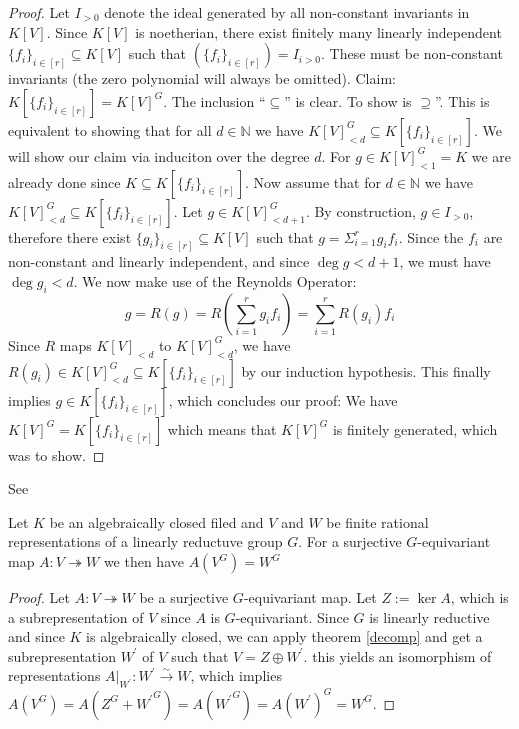 \begin{proof}
  Let $I_{>0}$ denote the ideal generated by all non-constant invariants in $K[V]$.
  Since $K[V]$ is noetherian, there exist finitely many linearly independent $\{f_i\}_{i \in [r]} \subseteq K[V]$ such that $ \left( \{f_i\}_{i \in [r]} \right) = I_{i>0} $.
  These must be non-constant invariants (the zero polynomial will always be omitted).
  Claim: $K[\{f_i\}_{i \in [r]}] = K[V]^G$.
  The inclusion ``$\subseteq$'' is clear.
  To show is $\supseteq$''.
  This is equivalent to showing that for all $d \in \mathbb{N}$ we have $K[V]^G_{<d} \subseteq K[\{f_i\}_{i \in [r]}] $.
  We will show our claim via induciton over the degree $d$.
  For $g \in K[V]^G_{<1} = K$ we are already done since $K \subseteq K[\{f_i\}_{i \in [r]}]$.
  Now assume that for $d \in \mathbb{N}$ we have $K[V]^G_{<d} \subseteq K[\{f_i\}_{i \in [r]}]$.
  Let $g \in K[V]^G_{< d+1}$.
  By construction, $g \in I_{>0}$, therefore there exist $\{g_i\}_{i \in [r]} \subseteq K[V]$ such that $g = \Sigma_{i=1}^r g_i f_i$.
  Since the $f_i$ are non-constant and linearly independent, and since $\operatorname{deg} g < d+1$, we must have $ \operatorname{deg} g_i < d $.
  We now make use of the Reynolds Operator:
  \begin{equation}
      g = R(g)
      =  R \left( \sum_{i=1}^r g_i f_i \right)
      = \sum_{i=1}^r R( g_i) f_i
  \end{equation}
  Since $R$ maps $K[V]_{<d}$ to $K[V]^G_{<d}$, we have $R(g_i) \in K[V]^G_{<d} \subseteq K[\{f_i\}_{i \in [r]}]$ by our induction hypothesis.
  This finally implies $ g \in K[\{f_i\}_{i \in [r]}]$, which concludes our proof:
  We have $K[V]^G = K[\{f_i\}_{i \in [r]}]$ which means that $K[V]^G$ is finitely generated, which was to show.
\end{proof}

\begin{lemma}
  See \cite[2.2.8]{DK15}

  Let $K$ be an algebraically closed filed and $V$ and $W$ be finite rational representations of a linearly reductuve group $G$.
  For a surjective $G$-equivariant map $A \colon V \twoheadrightarrow W$ we then have $A(V^G) = W^G$
\end{lemma}

\begin{proof}
  Let $A \colon V \twoheadrightarrow W$ be a surjective $G$-equivariant map.
  Let $Z := \operatorname{ker}A$, which is a subrepresentation of $V$ since $A$ is $G$-equivariant.
  Since $G$ is linearly reductive and since $K$ is algebraically closed, we can apply theorem \ref{decomp} and get a subrepresentation $W^\prime$ of $V$ such that $V = Z \oplus W^\prime$.
  this yields an isomorphism of representations $\left. A \right|_{W^\prime} \colon W^\prime \xrightarrow{\sim} W$, which implies $A(V^G) = A(Z^G + {W^\prime}^G) = A({W^\prime}^G) = A(W^\prime)^G = W^G$.
\end{proof}

